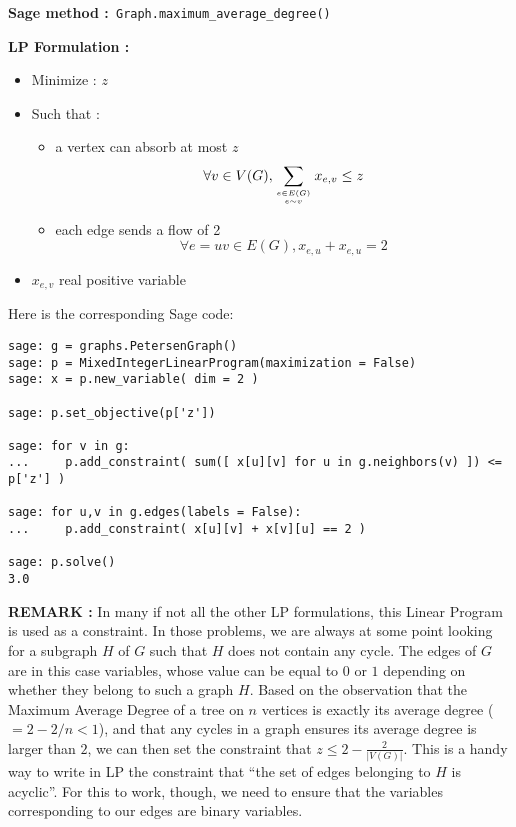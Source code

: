 {\bf Sage method :}\verb! Graph.maximum_average_degree()!

{\bf LP Formulation :}
\begin{itemize}
\item Minimize : $z$\\
\item Such that :
  \begin{itemize}
  \item     a vertex can absorb at most $z$
    $$\forall v\in V(G), \sum_{e\in E(G)\atop e\sim v}x_{e,v}\leq z$$
\item each edge sends a flow of 2
  $$\forall e=uv\in E(G), x_{e,u} + x_{e,u} = 2$$
  \end{itemize}
  \item $x_{e,v}$ real positive variable
\end{itemize}

Here is the corresponding Sage code:

\begin{lstlisting}
sage: g = graphs.PetersenGraph()
sage: p = MixedIntegerLinearProgram(maximization = False)
sage: x = p.new_variable( dim = 2 )

sage: p.set_objective(p['z'])

sage: for v in g:
...     p.add_constraint( sum([ x[u][v] for u in g.neighbors(v) ]) <= p['z'] )

sage: for u,v in g.edges(labels = False):
...     p.add_constraint( x[u][v] + x[v][u] == 2 )

sage: p.solve()
3.0
\end{lstlisting}

{\bf REMARK : } In many if not all the other LP formulations, this Linear Program is used as a constraint. In those problems, we are always at some point looking for a subgraph $H$ of $G$ such that $H$ does not contain any cycle. The edges of $G$ are in this case variables, whose value can be equal to $0$ or $1$ depending on whether they belong to such a graph $H$. Based on the observation that the Maximum Average Degree of a tree on $n$ vertices is exactly its average degree ($=2-2/n<1$), and that any cycles in a graph ensures its average degree is larger than $2$, we can then set the constraint that $z\leq 2-\frac 2 {|V(G)|}$. This is a handy way to write in LP the constraint that ``the set of edges belonging to $H$ is acyclic''. For this to work, though, we need to ensure that the variables corresponding to our edges are binary variables.



